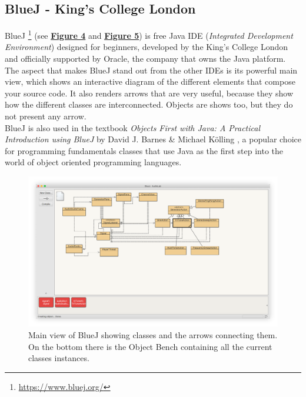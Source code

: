 \documentclass[]{usiinfbachelorproject}
\begin{document}
\subsection{BlueJ - King's College London}

BlueJ \footnote{\url{https://www.bluej.org/}} (see \hyperref[bluej_classes_objects]{\textbf{Figure 4}} and \hyperref[bluej_objects_open]{\textbf{Figure 5}}) is free Java IDE (\emph{Integrated Development Environment}) designed for beginners, developed by the King's College London and officially supported by Oracle, the company that owns the Java platform.
The aspect that makes BlueJ stand out from the other IDEs is its powerful main view, which shows an interactive diagram of the different elements that compose your source code. It also renders arrows that are very useful, because they show how the different classes are interconnected. Objects are shows too, but they do not present any arrow.\\
BlueJ is also used in the textbook \emph{Objects First with Java: A Practical Introduction using BlueJ} by David J. Barnes \& Michael K\"{o}lling \cite{barnes2016objects}, a popular choice for programming fundamentals classes that use Java as the first step into the world of object oriented programming languages.

\begin{figure}[h!]
\centering
\includegraphics[width=\textwidth]{figures/bluej_classes_objects.png}
\caption {Main view of BlueJ showing classes and the arrows connecting them. On the bottom there is the Object Bench containing all the current classes instances.}
\label {bluej_classes_objects}
\end{figure}
\end{document}
